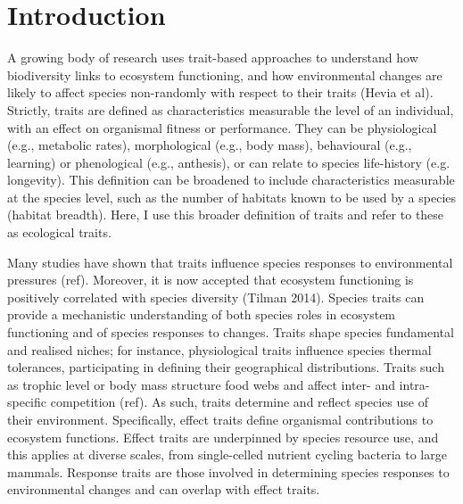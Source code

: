 \section{Introduction}

A growing body of research uses trait-based approaches to understand how biodiversity links to ecosystem functioning, and how environmental changes are likely to affect species non-randomly with respect to their traits (Hevia et al). Strictly, traits are defined as characteristics measurable the level of an individual, with an effect on organismal fitness or performance. They can be physiological (e.g., metabolic rates), morphological (e.g., body mass), behavioural (e.g., learning) or phenological (e.g., anthesis), or can relate to species life-history (e.g. longevity). This definition can be broadened to include characteristics measurable at the species level, such as the number of habitats known to be used by a species (habitat breadth). Here, I use this broader definition of traits and refer to these as ecological traits.

Many studies have shown that traits influence species responses to environmental pressures (ref). Moreover, it is now accepted that ecosystem functioning is positively correlated with species diversity (Tilman 2014). Species traits can provide a mechanistic understanding of both species roles in ecosystem functioning and of species responses to changes. Traits shape species fundamental and realised niches; for instance, physiological traits influence species thermal tolerances, participating in defining their geographical distributions. Traits such as trophic level or body mass structure food webs and affect inter- and intra-specific competition (ref). As such, traits determine and reflect species use of their environment. Specifically, effect traits define organismal contributions to ecosystem functions. Effect traits are underpinned by species resource use, and this applies at diverse scales, from single-celled nutrient cycling bacteria to large mammals. Response traits are those involved in determining species responses to environmental changes and can overlap with effect traits. 

